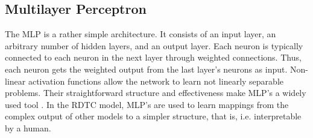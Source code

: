\documentclass[a4paper,cleardoubleempty,BCOR1cm, 11pt]{report}
\begin{document}
\subsection{Multilayer Perceptron}\label{sec:MLP}
The MLP is a rather simple architecture. It consists of an input layer, an arbitrary number of hidden layers, and an output layer. Each neuron is typically connected to each neuron in the next layer through weighted connections. Thus, each neuron gets the weighted output from the last layer's neurons as input. Non-linear activation functions allow the network to learn not linearly separable problems. Their straightforward structure and effectiveness make MLP's a widely used tool \cite{beale1990neural}. In the RDTC model, MLP's are used to learn mappings from the complex output of other models to a simpler structure, that is, i.e. interpretable by a human.
\end{document}
